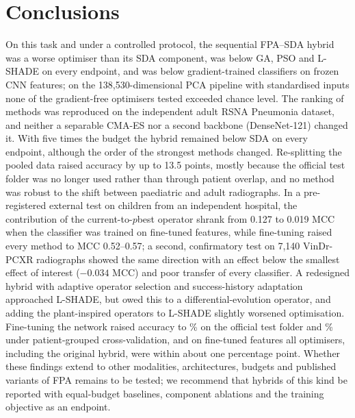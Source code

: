 \documentclass[10pt,letterpaper]{article}
\begin{document}
\section{Conclusions}\label{sec:conclusion}
On this task and under a controlled protocol, the sequential FPA--SDA hybrid was a worse optimiser than its SDA component, was below GA, PSO and L-SHADE on every endpoint, and was below gradient-trained classifiers on frozen CNN features; on the 138,530-dimensional PCA pipeline with standardised inputs none of the gradient-free optimisers tested exceeded chance level. The ranking of methods was reproduced on the independent adult RSNA Pneumonia dataset, and neither a separable CMA-ES nor a second backbone (DenseNet-121) changed it. With five times the budget the hybrid remained below SDA on every endpoint, although the order of the strongest methods changed. Re-splitting the pooled data raised accuracy by up to 13.5 points, mostly because the official test folder was no longer used rather than through patient overlap, and no method was robust to the shift between paediatric and adult radiographs. In a pre-registered external test on children from an independent hospital, the contribution of the current-to-$p$best operator shrank from 0.127 to 0.019 MCC when the classifier was trained on fine-tuned features, while fine-tuning raised every method to MCC 0.52--0.57; a second, confirmatory test on 7,140 VinDr-PCXR radiographs showed the same direction with an effect below the smallest effect of interest ($-0.034$ MCC) and poor transfer of every classifier. A redesigned hybrid with adaptive operator selection and success-history adaptation approached L-SHADE, but owed this to a differential-evolution operator, and adding the plant-inspired operators to L-SHADE slightly worsened optimisation. Fine-tuning the network raised accuracy to \FTOffAcc\% on the official test folder and \FTCvAcc\% under patient-grouped cross-validation, and on fine-tuned features all optimisers, including the original hybrid, were within about one percentage point. Whether these findings extend to other modalities, architectures, budgets and published variants of FPA remains to be tested; we recommend that hybrids of this kind be reported with equal-budget baselines, component ablations and the training objective as an endpoint.
\end{document}
